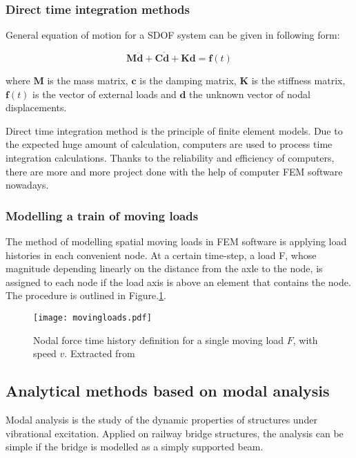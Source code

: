 \subsubsection{Direct time integration methods}
General equation of motion for a SDOF system can be given in following form:

\begin{equation}
	\boldsymbol{M\ddot{d}}+\boldsymbol{C\dot{d}}+\boldsymbol{Kd}=\boldsymbol{f}(t)
\end{equation}

where $\boldsymbol{M}$ is the mass matrix, $ \boldsymbol{c} $ is the damping matrix, $ \boldsymbol{K} $ is the stiffness matrix, $ \boldsymbol{f}(t) $ is the vector of external loads and $ \boldsymbol{d} $ the unknown vector of nodal displacements. 

Direct time integration method is the principle of finite element models. Due to the expected huge amount of calculation, computers are used to process time integration calculations. Thanks to the reliability and efficiency of computers, there are more and more project done with the help of computer FEM software nowadays.

\subsubsection{Modelling a train of moving loads}
The method of modelling spatial moving loads in FEM software is applying load histories in each convenient node. At a certain time-step, a load F, whose magnitude depending linearly on the distance from the axle to the node, is assigned to each node if the load axis is above an element that contains the node. The procedure is outlined in Figure.\ref{fig:movingloads}.

\begin{figure}[h]
	\centering
	\texttt{[image: movingloads.pdf]}
	\caption{Nodal force time history definition for a single moving load $F$, with speed $v$. Extracted from \cite[Figure 2.15]{da2007dynamic}}
	\label{fig:movingloads}
\end{figure}

\subsection{Analytical methods based on modal analysis}
Modal analysis is the study of the dynamic properties of structures under vibrational excitation. Applied on railway bridge structures, the analysis can be simple if the bridge is modelled as a simply supported beam.

